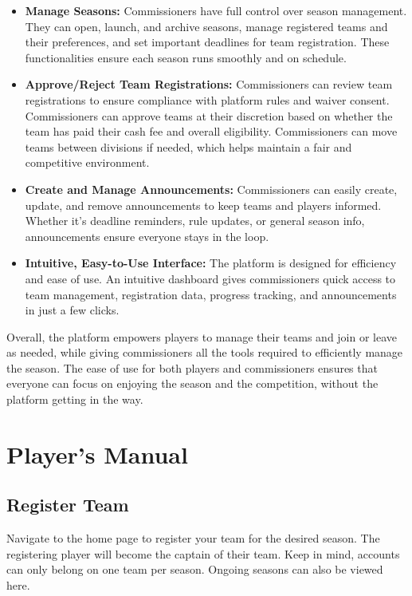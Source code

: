 \documentclass{article}
\begin{document}
\begin{itemize}
    \item \textbf{Manage Seasons:} Commissioners have full control over season management. They can open, launch, and archive seasons, manage registered teams and their preferences, and set important deadlines for team registration. These functionalities ensure each season runs smoothly and on schedule.
    \item \textbf{Approve/Reject Team Registrations:} Commissioners can review team registrations to ensure compliance with platform rules and waiver consent. Commissioners can approve teams at their discretion based on whether the team has paid their cash fee and overall eligibility. Commissioners can move teams between divisions if needed, which helps maintain a fair and competitive environment.
    \item \textbf{Create and Manage Announcements:} Commissioners can easily create, update, and remove announcements to keep teams and players informed. Whether it’s deadline reminders, rule updates, or general season info, announcements ensure everyone stays in the loop.
    \item \textbf{Intuitive, Easy-to-Use Interface:} The platform is designed for efficiency and ease of use. An intuitive dashboard gives commissioners quick access to team management, registration data, progress tracking, and announcements in just a few clicks.
\end{itemize}

\noindent Overall, the platform empowers players to manage their teams and join or leave as needed, while giving commissioners all the tools required to efficiently manage the season. The ease of use for both players and commissioners ensures that everyone can focus on enjoying the season and the competition, without the platform getting in the way.

\section{Player's Manual}
\subsection{Register Team}
Navigate to the home page to register your team for the desired season. The registering player will become the captain of their team. Keep in mind, accounts can only belong on one team per season. Ongoing seasons can also be viewed here.
\end{document}
